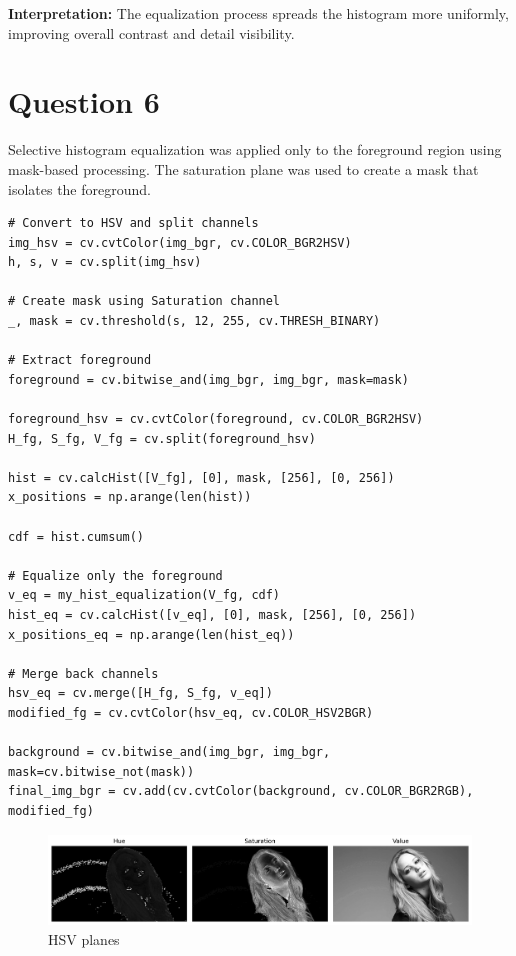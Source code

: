 \documentclass[10pt,a4paper]{article}
\begin{document}
\textbf{Interpretation:} The equalization process spreads the histogram more uniformly, improving overall contrast and detail visibility.

\section{Question 6}
Selective histogram equalization was applied only to the foreground region using mask-based processing. The saturation plane was used to create a mask that isolates the foreground.

\begin{lstlisting}[caption=Foreground histogram equalization]
# Convert to HSV and split channels
img_hsv = cv.cvtColor(img_bgr, cv.COLOR_BGR2HSV)
h, s, v = cv.split(img_hsv)

# Create mask using Saturation channel
_, mask = cv.threshold(s, 12, 255, cv.THRESH_BINARY)

# Extract foreground
foreground = cv.bitwise_and(img_bgr, img_bgr, mask=mask)

foreground_hsv = cv.cvtColor(foreground, cv.COLOR_BGR2HSV)
H_fg, S_fg, V_fg = cv.split(foreground_hsv)

hist = cv.calcHist([V_fg], [0], mask, [256], [0, 256])
x_positions = np.arange(len(hist))

cdf = hist.cumsum()

# Equalize only the foreground
v_eq = my_hist_equalization(V_fg, cdf)
hist_eq = cv.calcHist([v_eq], [0], mask, [256], [0, 256])
x_positions_eq = np.arange(len(hist_eq))

# Merge back channels
hsv_eq = cv.merge([H_fg, S_fg, v_eq])
modified_fg = cv.cvtColor(hsv_eq, cv.COLOR_HSV2BGR)

background = cv.bitwise_and(img_bgr, img_bgr, mask=cv.bitwise_not(mask))
final_img_bgr = cv.add(cv.cvtColor(background, cv.COLOR_BGR2RGB), modified_fg)
\end{lstlisting}


\begin{figure}
    \centering
        \includegraphics[width=\textwidth]{task6/1_hsv_planes.png}
        \caption{HSV planes}
\end{figure}
\end{document}
